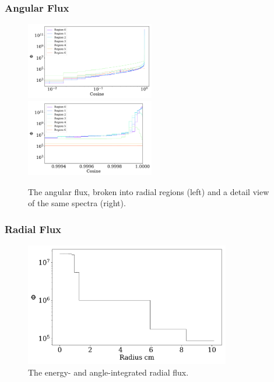\documentclass[fleqn]{beamer}
\begin{document}
\begin{frame}
\frametitle{Angular Flux}

\begin{figure}
\centering
\includegraphics[width = 0.5\textwidth]{flux_rad_cos}
\includegraphics[width = 0.5\textwidth]{flux_rad_cos_detail}
\caption{The angular flux, broken into radial regions (left) and a detail view of the same spectra (right).}
\end{figure}

\end{frame}

\begin{frame}
\frametitle{Radial Flux}

\begin{figure}
\centering
\includegraphics[width = 0.8\textwidth]{flux_rad}
\caption{The energy- and angle-integrated radial flux.}
\end{figure}

\end{frame}

\end{document}
